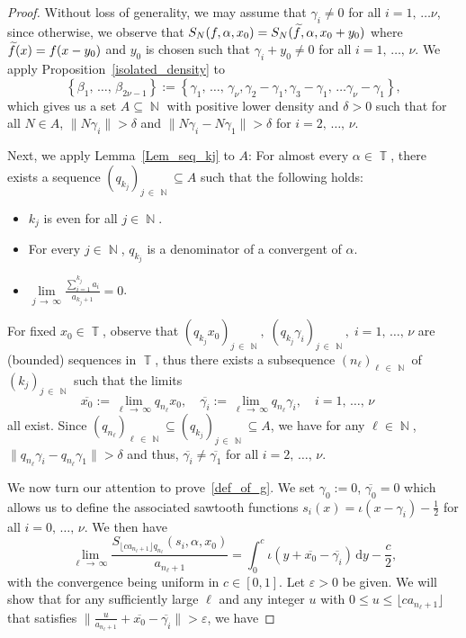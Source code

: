\documentclass[10pt,a4paper]{amsart}
\numberwithin{equation}{section}
\DeclareMathOperator{\N}{\mathbb{N}}
\DeclareMathOperator{\T}{\mathbb{T}}
\newcommand{\rmd}{\mathrm{d}}
\newcommand{\kj}{n_{\ell}}
\let\oldtilde\tilde
\renewcommand*{\tilde}[1]{\mathchoice{\widetilde{#1}}{\widetilde{#1}}{\oldtilde{#1}}{\oldtilde{#1}}}
\theoremstyle{definition}
\begin{document}
\begin{proof}
Without loss of generality, we may assume that $\gamma_i \neq 0$ for all $i = 1,\,\ldots\nu$, since otherwise, we observe that $S_N(f,\alpha,x_0) = S_N(\tilde{f},\alpha,x_0 + y_0)$ where $\tilde{f}(x) = f(x- y_0)$ and $y_0$ is chosen such that $\gamma_i + y_0 \neq 0$ for all $i = 1,\,\ldots,\,\nu$. We apply Proposition~\ref{isolated_density} to
\[
\left\{\beta_1,\,\ldots,\,\beta_{2\nu-1}\right\} := \left\{\gamma_1,\,\ldots,\,\gamma_{\nu},\gamma_2 - \gamma_1,\gamma_3-\gamma_1,\,\ldots\gamma_{\nu}-\gamma_{1}\right\},
\]
which gives us a set $A \subseteq \N$ with positive lower density and $\delta > 0$ such that for all $N \in A$, $ \| N\gamma_i\| > \delta$ and $\| N\gamma_i - N\gamma_1\| > \delta$ for $ i = 2,\,\ldots,\,\nu$.

Next, we apply Lemma~\ref{Lem_seq_kj} to $A$: For almost every $\alpha \in \T$, there exists a sequence $(q_{k_j})_{j\,\in \,\N} \subseteq A$ such that the following holds:
\begin{itemize}
\item $k_j$ is even for all $j \in \N$.
\item For every $j \in \N$, $q_{k_j}$ is a denominator of a convergent of $\alpha$.
\item $\lim\limits_{j\,\to\,\infty} \frac{\sum_{i =1}^{k_j} a_i }{a_{k_j+1}} = 0$.
\end{itemize}

For fixed $x_0 \in \T$, observe that $(q_{k_j}x_0)_{j\,\in\,\N},\; (q_{k_j}\gamma_i)_{j\,\in\,\N}, \; i = 1,\,\ldots,\,\nu$ are (bounded) sequences in $\T$, thus there exists a subsequence $(n_{\ell})_{\ell\,\in\,\N}$ of $(k_{j})_{j\,\in\,\N} $ such that the limits
\[
\overline{x_0} := \lim_{\ell\,\to\,\infty} q_{\kj}x_0, \quad \overline{\gamma_i} := \lim_{\ell\,\to\,\infty} q_{\kj}\gamma_i, \quad i = 1,\,\ldots,\,\nu \quad
\]
all exist. Since $(q_{\kj})_{\ell\,\in\,\N} \subseteq (q_{k_j})_{j\,\in\,\N} \subseteq A$, we have for any $\ell \in \N$, $\| q_{\kj}\gamma_i - q_{\kj}\gamma_1\| > \delta$ and thus, $\overline{\gamma_i} \neq \overline{\gamma_1}$ for all $i = 2,\,\ldots,\,\nu$.

We now turn our attention to prove~\eqref{def_of_g}. We set $\gamma_0:=0$, $\overline{\gamma_0}=0$ which allows us to define the associated sawtooth functions $s_i(x) = \iota(x-\gamma_i) - \frac{1}{2}$ for all $i=0,\,\ldots,\,\nu$. We then have
\begin{equation}\label{sawtooth_fct}
\lim_{\ell\,\to\,\infty} \frac{S_{ \lfloor c a_{\kj+1}\rfloor q_{\kj}}(s_i,\alpha,x_0)}{a_{\kj+1}} = \int_{0}^{c} \iota(y + \overline{x_0} - \overline{\gamma_i}) \, \rmd y - \frac{c}{2},
\end{equation}
with the convergence being uniform in $c \in [0,1]$. Let $\varepsilon > 0$ be given. We will show that for any sufficiently large $\ell$ and any integer $u$ with $0 \leq u \leq \lfloor c a_{\kj+1}\rfloor$ that satisfies $\|\frac{u}{a_{\kj +1}} + \overline{x_0}- \overline{\gamma_i}\| > \varepsilon$, we have


\end{proof}
\end{document}
